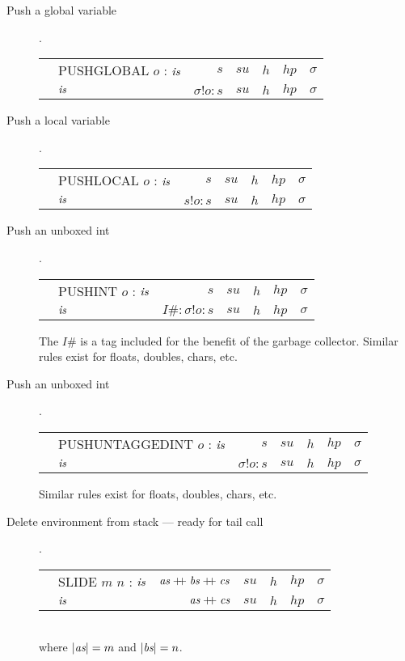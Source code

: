 \documentclass[11pt]{article}
\begin{document}
\begin{description}

\item[ Push a global variable ].

\begin{tabular}{|llrrrrr|}
\hline
	& PUSHGLOBAL $o$ : $\mbox{\it is}$ & $s$ 		& $su$ & $h$ & $hp$ & $\sigma$ \\
\next	& $\mbox{\it is}$			 & $\sigma!o:s$ & $su$ & $h$ & $hp$ & $\sigma$ \\
\hline
\end{tabular}

\item[ Push a local variable ].

\begin{tabular}{|llrrrrr|}
\hline
	& PUSHLOCAL $o$ : $\mbox{\it is}$	& $s$ 		& $su$ & $h$ & $hp$ & $\sigma$ \\
\next	& $\mbox{\it is}$			& $s!o : s$ 	& $su$ & $h$ & $hp$ & $\sigma$ \\
\hline
\end{tabular}

\item[ Push an unboxed int ].

\begin{tabular}{|llrrrrr|}
\hline
	& PUSHINT $o$ : $\mbox{\it is}$	& $s$ 		        & $su$ & $h$ & $hp$ & $\sigma$ \\
\next	& $\mbox{\it is}$			& $I\# : \sigma!o : s$ 	& $su$ & $h$ & $hp$ & $\sigma$ \\
\hline
\end{tabular}

The $I\#$ is a tag included for the benefit of the garbage collector.
Similar rules exist for floats, doubles, chars, etc.

\item[ Push an unboxed int ].

\begin{tabular}{|llrrrrr|}
\hline
	& PUSHUNTAGGEDINT $o$ : $\mbox{\it is}$	& $s$ 		        & $su$ & $h$ & $hp$ & $\sigma$ \\
\next	& $\mbox{\it is}$			& $\sigma!o : s$ 	& $su$ & $h$ & $hp$ & $\sigma$ \\
\hline
\end{tabular}

Similar rules exist for floats, doubles, chars, etc.

\item[ Delete environment from stack --- ready for tail call ].

\begin{tabular}{|llrrrrr|}
\hline
	& SLIDE $m$ $n$ : $\mbox{\it is}$	& $\mbox{\it as} \mathrel{+\mkern-6mu+} \mbox{\it bs} \mathrel{+\mkern-6mu+} \mbox{\it cs}$		& $su$ & $h$ & $hp$ & $\sigma$ \\
\next	& $\mbox{\it is}$			& $\mbox{\it as} \mathrel{+\mkern-6mu+} \mbox{\it cs}$			& $su$ & $h$ & $hp$ & $\sigma$ \\
\hline
\end{tabular}
\\
where ${\vert {\mbox{\it as}} \vert} = m$ and ${\vert {\mbox{\it bs}} \vert} = n$.



\end{description}
\end{document}
